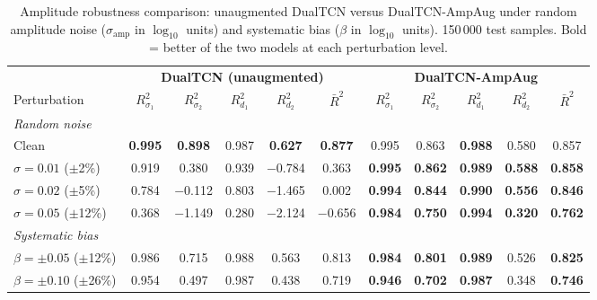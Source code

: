 \documentclass[journal]{IEEEtran}
\begin{document}
\begin{table}[t]
  \centering
  \caption{Amplitude robustness comparison: unaugmented DualTCN
  versus DualTCN-AmpAug under random amplitude noise
  ($\sigma_\mathrm{amp}$ in $\log_{10}$ units) and systematic bias
  ($\beta$ in $\log_{10}$ units).  150\,000 test samples.
  Bold = better of the two models at each perturbation level.}
  \label{tab:aug_robustness}
  \small
  \setlength{\tabcolsep}{4pt}
  \begin{tabular}{l@{\;\;}ccccc@{\qquad}ccccc}
    \toprule
    & \multicolumn{5}{c}{\textbf{DualTCN (unaugmented)}}
    & \multicolumn{5}{c}{\textbf{DualTCN-AmpAug}} \\
    \cmidrule(lr){2-6} \cmidrule(lr){7-11}
    Perturbation & $R^2_{\sigma_1}$ & $R^2_{\sigma_2}$ & $R^2_{d_1}$
      & $R^2_{d_2}$ & $\bar{R}^2$
      & $R^2_{\sigma_1}$ & $R^2_{\sigma_2}$ & $R^2_{d_1}$
      & $R^2_{d_2}$ & $\bar{R}^2$ \\
    \midrule
    \multicolumn{11}{l}{\textit{Random noise}} \\
    Clean       & \textbf{0.995} & \textbf{0.898} & 0.987
      & \textbf{0.627} & \textbf{0.877}
      & 0.995 & 0.863 & \textbf{0.988} & 0.580 & 0.857 \\
    $\sigma{=}0.01$ ($\pm$2\%)
      & 0.919 & 0.380 & 0.939 & $-$0.784 & 0.363
      & \textbf{0.995} & \textbf{0.862} & \textbf{0.989}
      & \textbf{0.588} & \textbf{0.858} \\
    $\sigma{=}0.02$ ($\pm$5\%)
      & 0.784 & $-$0.112 & 0.803 & $-$1.465 & 0.002
      & \textbf{0.994} & \textbf{0.844} & \textbf{0.990}
      & \textbf{0.556} & \textbf{0.846} \\
    $\sigma{=}0.05$ ($\pm$12\%)
      & 0.368 & $-$1.149 & 0.280 & $-$2.124 & $-$0.656
      & \textbf{0.984} & \textbf{0.750} & \textbf{0.994}
      & \textbf{0.320} & \textbf{0.762} \\
    \midrule
    \multicolumn{11}{l}{\textit{Systematic bias}} \\
    $\beta{=}{\pm}0.05$ ($\pm$12\%)
      & 0.986 & 0.715 & 0.988 & 0.563 & 0.813
      & \textbf{0.984} & \textbf{0.801} & \textbf{0.989}
      & 0.526 & \textbf{0.825} \\
    $\beta{=}{\pm}0.10$ ($\pm$26\%)
      & 0.954 & 0.497 & 0.987 & 0.438 & 0.719
      & \textbf{0.946} & \textbf{0.702} & \textbf{0.987}
      & 0.348 & \textbf{0.746} \\
    \bottomrule
  \end{tabular}
\end{table}
\end{document}
